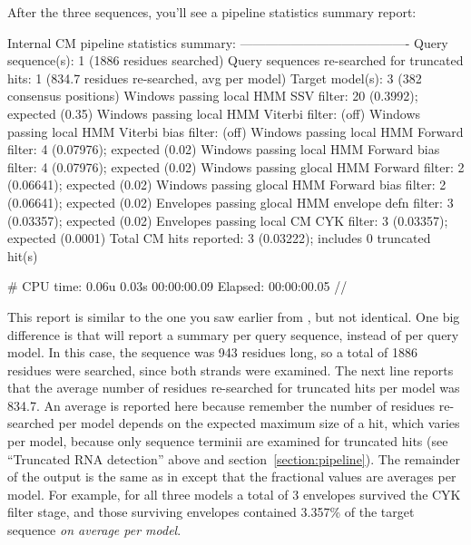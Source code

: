 After the three sequences, you'll see a pipeline statistics summary
report:

\begin{widesreoutput}
Internal CM pipeline statistics summary:
----------------------------------------
Query sequence(s):                                               1  (1886 residues searched)
Query sequences re-searched for truncated hits:                  1  (834.7 residues re-searched, avg per model)
Target model(s):                                                 3  (382 consensus positions)
Windows   passing  local HMM SSV           filter:              20  (0.3992); expected (0.35)
Windows   passing  local HMM Viterbi       filter:                  (off)
Windows   passing  local HMM Viterbi  bias filter:                  (off)
Windows   passing  local HMM Forward       filter:               4  (0.07976); expected (0.02)
Windows   passing  local HMM Forward  bias filter:               4  (0.07976); expected (0.02)
Windows   passing glocal HMM Forward       filter:               2  (0.06641); expected (0.02)
Windows   passing glocal HMM Forward  bias filter:               2  (0.06641); expected (0.02)
Envelopes passing glocal HMM envelope defn filter:               3  (0.03357); expected (0.02)
Envelopes passing  local CM  CYK           filter:               3  (0.03357); expected (0.0001)
Total CM hits reported:                                          3  (0.03222); includes 0 truncated hit(s)

# CPU time: 0.06u 0.03s 00:00:00.09 Elapsed: 00:00:00.05
//
\end{widesreoutput}

This report is similar to the one you saw earlier from
, but not identical. One big difference is that
 will report a summary per query sequence, instead of per
query model. In this case, the sequence was 943 residues long, so a
total of 1886 residues were searched, since both strands were
examined. The next line reports that the average number of residues
re-searched for truncated hits per model was 834.7. An average is
reported here because remember the number of residues re-searched per
model depends on the expected maximum size of a hit, which varies per
model, because only sequence terminii are examined for truncated hits
(see ``Truncated RNA detection'' above and
section~\ref{section:pipeline}).  The remainder of the output is the
same as in  except that the fractional values are
averages per model. For example, for all three models a total of 3
envelopes survived the CYK filter stage, and those surviving envelopes
contained 3.357\% of the target sequence \emph{on average per model}.

